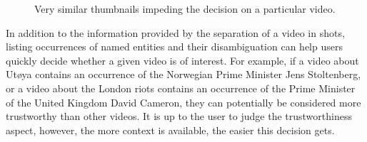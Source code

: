 \documentclass[runningheads,a4paper]{llncs}
\begin{document}
\begin{figure}[htb!]
  \begin{center}
\hspace{10pt}
  \caption{Very similar thumbnails impeding the decision on a particular video.}
  \label{fig:thumbnails}
  \end{center}  
\end{figure}

In addition to the information provided by the separation of a video in shots, listing occurrences of named entities and their disambiguation can help users quickly decide whether a given video is of interest. For example, if a video about Ut\o ya contains an occurrence of the Norwegian Prime Minister Jens Stoltenberg, or a video about the London riots contains an occurrence of the Prime Minister of the United Kingdom David Cameron, they can potentially be considered more trustworthy than other videos. It is up to the user to judge the trustworthiness aspect, however, the more context is available, the easier this decision gets.
\end{document}
